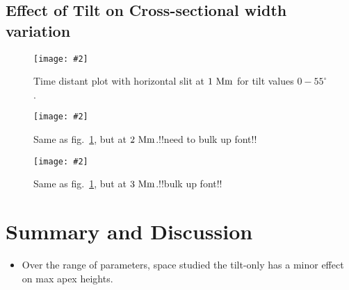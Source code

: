 \documentclass[12pt]{ociamthesis}
\newcommand{\mfig}[4]{
  \begin{figure}
  \begin{center}
  \texttt{[image: \#2]}
  \caption{#3}
  \label{#4}
  \end{center}
  \end{figure}}
\begin{document}
\subsection{Effect of Tilt on Cross-sectional width variation}
\label{subsec:oscillating}

\mfig{1}{figures/test_td_plot_1Mm.png}{Time distant plot with horizontal slit at $1~\rm{Mm}$ for tilt values $0-55^{\circ}$.}{td_1Mm}

\mfig{1}{figures/test_td_plot_2Mm.png}{Same as fig.~\ref{td_1Mm}, but at $2~\rm{Mm}$.!!need to bulk up font!!}{td_2Mm}

\mfig{1}{figures/test_td_plot_3Mm.png}{Same as fig.~\ref{td_1Mm}, but at $3~\rm{Mm}$.!!bulk up font!!}{td_3Mm}

\section{Summary and Discussion}
\label{sec:sum}
\begin{itemize}
\item Over the range of parameters, space studied the tilt-only has a minor effect on max apex heights. 
\end{itemize}




  
\end{document}
